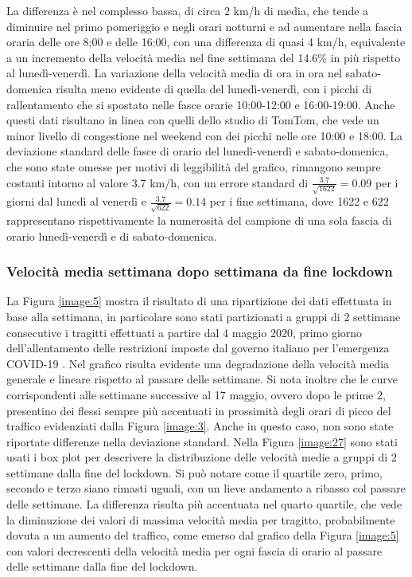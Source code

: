 La differenza è nel complesso bassa, di circa 2 km/h di media, che tende a diminuire nel primo pomeriggio e negli orari notturni e ad aumentare nella fascia oraria delle ore 8;00 e delle 16:00, con una differenza di quasi 4 km/h, equivalente a un incremento della velocità media nel fine settimana del 14.6\% in più rispetto al lunedì-venerdì. La variazione della velocità media di ora in ora nel sabato-domenica risulta meno evidente di quella del lunedì-venerdì, con i picchi di rallentamento che si spostato nelle fasce orarie 10:00-12:00 e 16:00-19:00. Anche questi dati risultano in linea con quelli dello studio di TomTom, che vede un minor livello di congestione nel weekend con dei picchi nelle ore 10:00 e 18:00. La deviazione standard delle fasce di orario del lunedì-venerdì e sabato-domenica, che sono state omesse per motivi di leggibilità del grafico, rimangono sempre costanti intorno al valore 3.7 km/h, con un errore standard di $\frac{3.7}{\sqrt{1622}} = 0.09$ per i giorni dal lunedì al venerdì e $\frac{3.7}{\sqrt{622}} = 0.14$ per i fine settimana, dove 1622 e 622 rappresentano rispettivamente la numerosità del campione di una sola fascia di orario lunedì-venerdì e di sabato-domenica.

\subsubsection{Velocità media settimana dopo settimana da fine lockdown}

La Figura \ref{image:5} mostra il risultato di una ripartizione dei dati effettuata in base alla settimana, in particolare sono stati partizionati a gruppi di 2 settimane consecutive i tragitti effettuati a partire dal 4 maggio 2020, primo giorno dell'allentamento delle restrizioni imposte dal governo italiano per l'emergenza COVID-19 \cite{misuredelgovernopercovid}. Nel grafico risulta evidente una degradazione della velocità media generale e lineare rispetto al passare delle settimane. Si nota inoltre che le curve corrispondenti alle settimane successive al 17 maggio, ovvero dopo le prime 2, presentino dei flessi sempre più accentuati in prossimità degli orari di picco del traffico evidenziati dalla Figura \ref{image:3}. Anche in questo caso, non sono state riportate differenze nella deviazione standard. Nella Figura \ref{image:27} sono stati usati i box plot per descrivere la distribuzione delle velocità medie a gruppi di 2 settimane dalla fine del lockdown. Si può notare come il quartile zero, primo, secondo e terzo siano rimasti uguali, con un lieve andamento a ribasso col passare delle settimane. La differenza risulta più accentuata nel quarto quartile, che vede la diminuzione dei valori di massima velocità media per tragitto, probabilmente dovuta a un aumento del traffico, come emerso dal grafico della Figura \ref{image:5} con valori decrescenti della velocità media per ogni fascia di orario al passare delle settimane dalla fine del lockdown.

